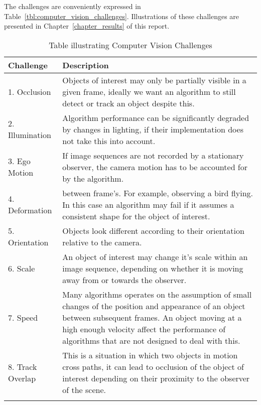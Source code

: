 The challenges are conveniently expressed in
Table~\ref{tbl:computer_vision_challenges}. Illustrations of these challenges
are presented in Chapter~\ref{chapter_results} of this report.

\begin{longtable}{p{5cm}  p{8cm}}
    \hline
    \textbf{Challenge} & \textbf{Description} \\ 
    \hline\hline
    
    1. Occlusion
    & 
    Objects of interest may only be partially visible in a
    given frame, ideally we want an algorithm to still detect or
    track an object despite this.
    \\ \bottomrule
    
    2. Illumination
    &
    Algorithm performance can be significantly degraded by changes
    in lighting, if their implementation does not take this into
    account.
    \\ \bottomrule
    
    3. Ego Motion
    &
    If image sequences are not recorded by a stationary observer,
    the camera motion has to be accounted for by the algorithm.
    \\ \bottomrule
    
    4. Deformation
    &
    between frame's. For example, observing a bird flying. In this
    case an algorithm may fail if it assumes a consistent shape for
    the object of interest.
    \\ \bottomrule

    5. Orientation
    &
    Objects look different according to their orientation relative
    to the camera.
    \\ \bottomrule

    6. Scale
    &
    An object of interest may change it's scale within an image
    sequence, depending on whether it is moving away from or towards
    the observer.
    \\ \bottomrule

    7. Speed 
    &
    Many algorithms operates on the assumption of small
    changes of the position and appearance of an object between
    subsequent frames. An object moving at a high enough velocity
    affect the performance of algorithms that are not designed to
    deal with this.
    \\ \bottomrule
  
    8. Track Overlap
    &
    This is a situation in which two objects in motion cross paths, it can lead
    to occlusion of the object of interest depending on their proximity to the
    observer of the scene.
    \\ \bottomrule

    \caption{Table illustrating Computer Vision Challenges}
\end{longtable}\label{tbl:computer_vision_challenges}

